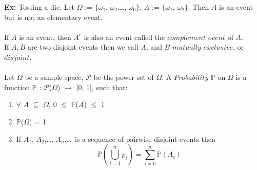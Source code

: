 \documentclass{article}
\newcommand{\ti}[1]{\textit{#1}}
\newcommand{\bbP}{\mathbb{P}}
\newcommand{\Om}{\Omega}
\begin{document}
\textbf{Ex:} Tossing a die. Let $\Omega$ := $\{$$\omega_{1}$, $\omega_{2}$,\dots, $\omega_{6}$$\}$, $A$ := $\{$$\omega_{1}$, $\omega_{2}$$\}$. Then $A$ is an event but is not an elementary event.\\\\
If $A$ is an event, then $A^{c}$ is also an event called the $\ti{complement event}$ of $A$.\\
If $A, B$ are two disjoint events then we call $A$, and $B$ $\ti{mutually exclusive}$, or $\ti{disjoint}$.\\\\
Let $\Omega$ be a sample space, $\mathcal{P}$ be the power set of $\Om$. A $\ti{Probability}$ $\bbP$ on $\Om$ is a function $\bbP$ : $\mathcal{P}$($\Om$) $\rightarrow$ [0, 1], such that:
\begin{enumerate}
	\item $\forall$ $A$ $\subseteq$ $\Om$, 0 $\leq$ $\bbP$($A$) $\leq$ 1
	\item $\bbP$($\Om$) = 1
	\item If $A_{1}$, $A_{2}$,\dots, $A_{n}$,\dots\ is a sequence of pairwise disjoint events then
\[ \bbP(\bigcup_{i=1}^{\infty} p_{i}) = \sum_{i=0}^{\infty} \bbP(A_{i}) \]
\end{enumerate}
\newpage
\end{document}
